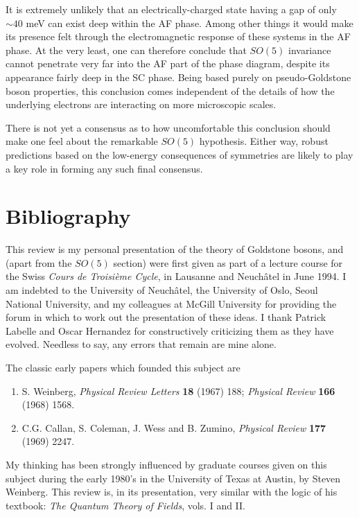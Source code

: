 \documentclass[12pt]{report}
\begin{document}
It is extremely unlikely that an electrically-charged state
having a gap of only $\sim 40$ meV can exist deep within the
AF phase. Among other things it would make its presence felt
through the electromagnetic response of these systems in the
AF phase. At the very least, one can therefore conclude that
$SO(5)$ invariance cannot penetrate very far into the AF
part of the phase diagram, despite its appearance fairly
deep in the SC phase. Being based purely on
pseudo-Goldstone boson properties, this conclusion comes
independent of the details of how the underlying electrons
are interacting on more microscopic scales.

There is not yet a consensus as to how uncomfortable this
conclusion should make one feel about the remarkable
$SO(5)$ hypothesis. Either way, robust predictions based on
the low-energy consequences of symmetries are likely to play
a key role in forming any such final consensus.

\chapter{Bibliography}

This review is my personal presentation of the theory of
Goldstone bosons, and (apart from the $SO(5)$ section) were
first given as part of a lecture course for the Swiss {\it
Cours de Troisi\`eme Cycle}, in Lausanne and Neuch\^atel in
June 1994. I am indebted to the University of Neuch\^atel,
the University of Oslo, Seoul National University, and my
colleagues at McGill University for providing the forum in
which to work out the presentation of these ideas. I
thank Patrick Labelle and Oscar Hernandez for constructively criticizing them as they have evolved. Needless to say, any errors that remain are mine alone.

The classic early papers which founded this subject are

\begin{enumerate}

\item
S. Weinberg, {\it Physical Review Letters} {\bf 18} (1967)
188;
{\it Physical Review}  {\bf 166} (1968) 1568. 

\item
C.G. Callan, S. Coleman, J. Wess and B. Zumino, {\it
Physical Review} {\bf 177} (1969) 2247.

\end{enumerate}

My thinking has been  strongly influenced by graduate
courses given on this subject during the early 1980's in
the University of Texas at Austin, by Steven Weinberg.
This review is, in its presentation,  very similar
with  the logic of his textbook: {\sl The Quantum Theory of
Fields}, vols. I and II.
\end{document}
